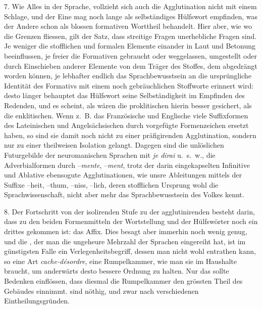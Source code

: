 \label{IV.III.II.4.7}7. Wie Alles in der Sprache, vollzieht sich auch die Agglutination nicht mit einem Schlage, und der Eine mag noch lange als selbständiges Hülfswort empfinden, was der Andere schon als blossen formativen Worttheil behandelt. Hier aber, wie  wo die Grenzen fliessen, gilt der Satz, dass streitige Fragen unerhebliche Fragen sind. Je weniger die stofflichen und formalen Elemente einander in Laut und Betonung beeinflussen, je freier die Formativen gebraucht oder weggelassen, um\label{fp.331}gestellt oder durch Einschieben anderer Elemente von dem Träger des Stoffes, dem  abgedrängt worden können, je lebhafter endlich das Sprachbewusstsein an die ursprüngliche Identität des Formativs mit einem noch gebräuchlichen Stoffworte erinnert wird: desto länger behauptet das Hülfswort seine Selbständigkeit im Empfinden des Redenden, und es scheint, als wären die proklitischen  hierin besser gesichert, als die enklitischen. Wenn z.~B. das Französische und Englische viele Suffixformen des Lateinischen und Angelsächsischen durch vorgefügte Formenzeichen ersetzt haben, so sind sie damit noch nicht zu einer präfigirenden Agglutination, sondern nur zu einer theilweisen Isolation gelangt. Dagegen sind die unlöslichen Futurgebilde der neuromanischen Sprachen mit  \textit{je dirai} u.~s.~w., die Adverbialformen durch –\textit{mente}, –\textit{ment}, trotz der darin eingekapselten Infinitive und Ablative ebensogute Agglutinationen, wie unsre Ableitungen mittels der  Suffixe –heit, –thum, –niss, –lich, deren stofflichen Ursprung wohl die Sprachwissenschaft, nicht aber mehr das Sprachbewusstsein des Volkes kennt.

\label{sp.349}

\label{IV.III.II.4.8}8. Der Fortschritt von der isolirenden Stufe zu der agglutinirenden besteht darin, dass zu den beiden Formenmitteln der Wortstellung und der Hülfswörter noch ein drittes gekommen ist: das Affix. Dies besagt aber immerhin noch wenig genug, und die  , der man die ungeheure Mehrzahl der Sprachen eingereiht hat, ist im günstigsten Falle ein Verlegenheitsbegriff, dessen man nicht wohl entrathen kann, so eine Art \textit{cache-désordre}, eine Rumpelkammer, wie man sie im Haushalte braucht, um anderwärts desto bessere Ordnung zu halten. Nur das sollte Bedenken einflössen, dass diesmal die Rumpelkammer den grössten Theil des Gebäudes einnimmt.  sind nöthig, und zwar nach verschiedenen Eintheilungsgründen.


